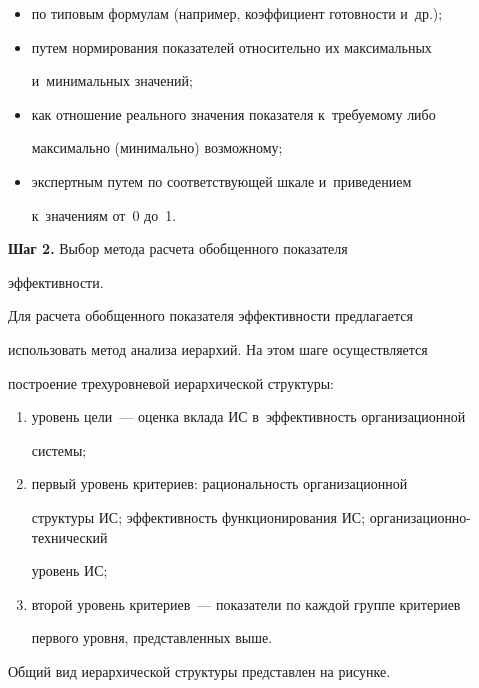   \begin{itemize}

  \item по типовым формулам (например, коэффициент готовности и~др.);

  \item путем нормирования показателей относительно их максимальных 

и~минимальных значений; 

  \item как отношение реального значения показателя к~требуемому либо 

максимально (минимально) возможному;

  \item экспертным путем по соответствующей шкале и~приведением 

к~значениям от~0 до~1.

  \end{itemize}

  

  \textbf{Шаг 2.} Выбор метода расчета обобщенного показателя 

эффективности.

  

  Для расчета обобщенного показателя эффективности предлагается 

использовать метод анализа иерархий. На этом шаге осуществляется 

построение трехуровневой иерархической структуры:

  \begin{enumerate}[(1)]

  \item уровень цели~--- оценка вклада ИС в~эффективность организационной 

системы; 

  \item первый уровень критериев: рациональность организационной 

структуры ИС; эффективность функционирования ИС; организационно-тех\-ни\-че\-ский 

уровень ИС;

\item второй уровень критериев~--- показатели по каждой группе критериев 

первого уровня, представленных выше. 

\end{enumerate}



  Общий вид иерархической структуры представлен на рисунке.



